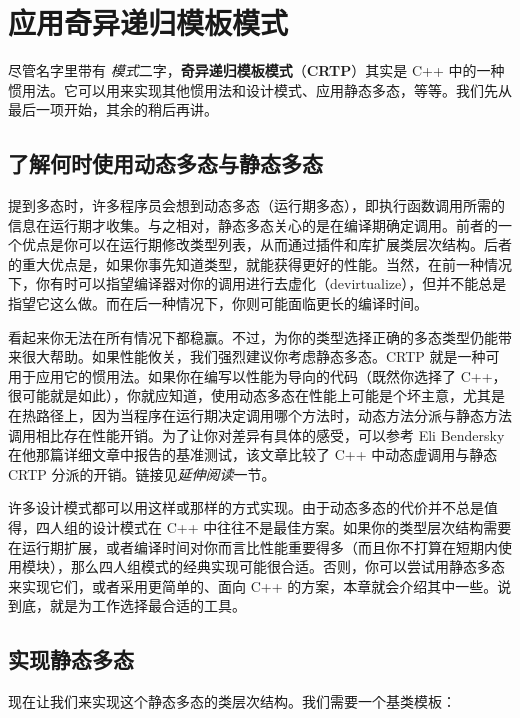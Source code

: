 \section{应用奇异递归模板模式}

\label{idx:546}
尽管名字里带有 \emph{模式}二字，\textbf{奇异递归模板模式}（\textbf{CRTP}）其实是 C++ 中的一种惯用法。它可以用来实现其他惯用法和设计模式、应用静态多态，等等。我们先从最后一项开始，其余的稍后再讲。

\subsection{了解何时使用动态多态与静态多态}

\label{idx:547}
\label{idx:548}
提到多态时，许多程序员会想到动态多态（运行期多态），即执行函数调用所需的信息在运行期才收集。与之相对，静态多态关心的是在编译期确定调用。前者的一个优点是你可以在运行期修改类型列表，从而通过插件和库扩展类层次结构。后者的重大优点是，如果你事先知道类型，就能获得更好的性能。当然，在前一种情况下，你有时可以指望编译器对你的调用进行去虚化（devirtualize），但并不能总是指望它这么做。而在后一种情况下，你则可能面临更长的编译时间。

\label{idx:549}
看起来你无法在所有情况下都稳赢。不过，为你的类型选择正确的多态类型仍能带来很大帮助。如果性能攸关，我们强烈建议你考虑静态多态。CRTP 就是一种可用于应用它的惯用法。如果你在编写以性能为导向的代码（既然你选择了 C++，很可能就是如此），你就应知道，使用动态多态在性能上可能是个坏主意，尤其是在热路径上，因为当程序在运行期决定调用哪个方法时，动态方法分派与静态方法调用相比存在性能开销。为了让你对差异有具体的感受，可以参考 Eli Bendersky 在他那篇详细文章中报告的基准测试，该文章比较了 C++ 中动态虚调用与静态 CRTP 分派的开销。链接见\emph{延伸阅读}一节。

\label{idx:550}
许多设计模式都可以用这样或那样的方式实现。由于动态多态的代价并不总是值得，四人组的设计模式在 C++ 中往往不是最佳方案。如果你的类型层次结构需要在运行期扩展，或者编译时间对你而言比性能重要得多（而且你不打算在短期内使用模块），那么四人组模式的经典实现可能很合适。否则，你可以尝试用静态多态来实现它们，或者采用更简单的、面向 C++ 的方案，本章就会介绍其中一些。说到底，就是为工作选择最合适的工具。

\subsection{实现静态多态}

\label{idx:551}
现在让我们来实现这个静态多态的类层次结构。我们需要一个基类模板：

